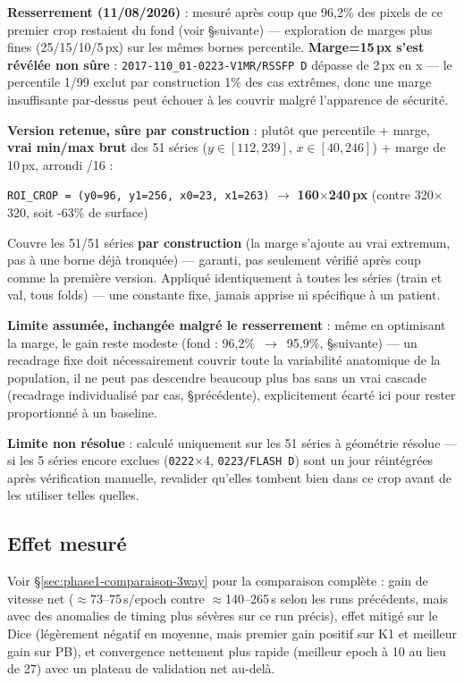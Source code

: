 \textbf{Resserrement (11/08/2026)} : mesuré après coup que 96,2\% des pixels de ce
premier crop restaient du fond (voir \S suivante) --- exploration de marges plus
fines (25/15/10/5\,px) sur les mêmes bornes percentile. \textbf{Marge=15\,px
s'est révélée non sûre} : \texttt{2017-110\_01-0223-V1MR/RSSFP D} dépasse de 2\,px
en x --- le percentile 1/99 exclut par construction 1\% des cas extrêmes, donc une
marge insuffisante par-dessus peut échouer à les couvrir malgré l'apparence de
sécurité.

\textbf{Version retenue, sûre par construction} : plutôt que percentile + marge,
\textbf{vrai min/max brut} des 51 séries ($y\in[112,239]$, $x\in[40,246]$) + marge de
10\,px, arrondi /16 :

\begin{center}
\texttt{ROI\_CROP = (y0=96, y1=256, x0=23, x1=263)} $\to$ \textbf{160$\times$240\,px}
(contre 320$\times$320, soit -63\% de surface)
\end{center}

Couvre les 51/51 séries \textbf{par construction} (la marge s'ajoute au vrai
extremum, pas à une borne déjà tronquée) --- garanti, pas seulement vérifié après
coup comme la première version. Appliqué identiquement à toutes les séries (train et
val, tous folds) --- une constante fixe, jamais apprise ni spécifique à un patient.

\textbf{Limite assumée, inchangée malgré le resserrement} : même en optimisant la
marge, le gain reste modeste (fond : 96,2\%~$\to$~95,9\%, \S suivante) --- un
recadrage fixe doit nécessairement couvrir toute la variabilité anatomique de la
population, il ne peut pas descendre beaucoup plus bas sans un vrai cascade
(recadrage individualisé par cas, \S précédente), explicitement écarté ici pour
rester proportionné à un baseline.

\textbf{Limite non résolue} : calculé uniquement sur les 51 séries à géométrie
résolue --- si les 5 séries encore exclues (\texttt{0222}$\times$4,
\texttt{0223/FLASH D}) sont un jour réintégrées après vérification manuelle, revalider
qu'elles tombent bien dans ce crop avant de les utiliser telles quelles.

\subsection{Effet mesuré}

Voir \S\ref{sec:phase1-comparaison-3way} pour la comparaison complète : gain de
vitesse net ($\approx$73--75\,s/epoch contre $\approx$140--265\,s selon les runs
précédents, mais avec des anomalies de timing plus sévères sur ce run précis), effet
mitigé sur le Dice (légèrement négatif en moyenne, mais premier gain positif sur K1
et meilleur gain sur PB), et convergence nettement plus rapide (meilleur epoch à 10
au lieu de 27) avec un plateau de validation net au-delà.

